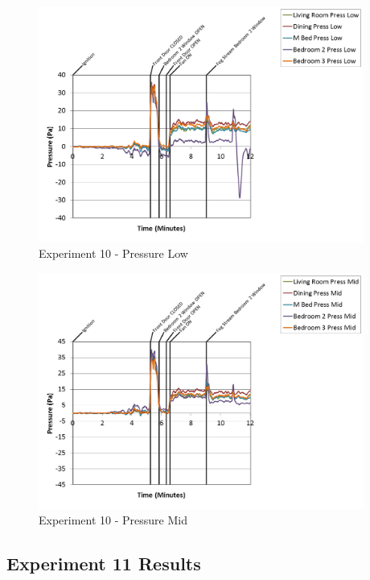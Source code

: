 \documentclass{article}
\begin{document}
\begin{appendices}
\clearpage

\begin{figure}[h!]
	\centering
	\includegraphics[height=3.05in]{0_Images/Results_Charts/Exp_10_Charts/PressureLow.png}
	\caption{Experiment 10 - Pressure Low}
\end{figure}


\begin{figure}[h!]
	\centering
	\includegraphics[height=3.05in]{0_Images/Results_Charts/Exp_10_Charts/PressureMid.png}
	\caption{Experiment 10 - Pressure Mid}
\end{figure}

\clearpage

\clearpage
\clearpage		\large
\subsection{Experiment 11 Results} \label{App:Exp11Results} 


\end{appendices}
\end{document}
